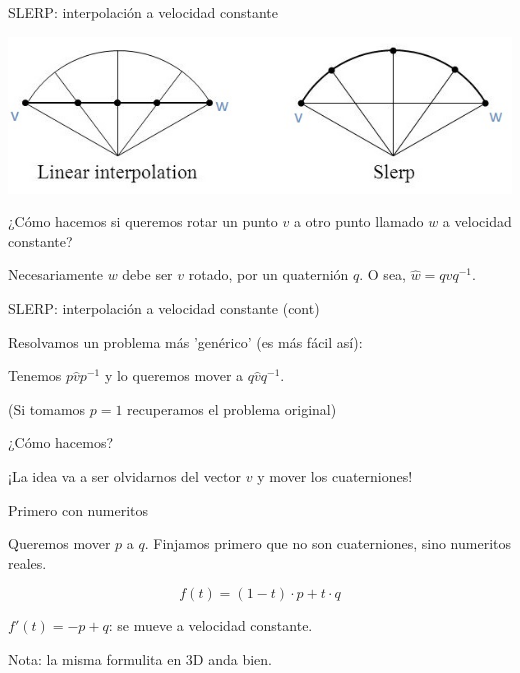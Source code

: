 \documentclass[10pt]{beamer}
\def\m{^{-1}}
\begin{document}
\fi


\begin{frame}{SLERP: interpolación a velocidad constante}

\includegraphics[scale=0.66]{Slerp2.jpg} \bigskip

¿Cómo hacemos si queremos rotar un punto $v$ a otro punto llamado $w$ a velocidad constante? 

Necesariamente $w$ debe ser $v$ rotado, por un quaternión $q$. O sea, $\hat{w}=q\hat{v}q\m$. 

\end{frame}

\begin{frame}{SLERP: interpolación a velocidad constante (cont)}

Resolvamos un problema más 'genérico' (es más fácil así):

Tenemos $p\hat{v}p\m$ y lo queremos mover a $q\hat{v}q\m$.

(Si tomamos $p=1$ recuperamos el problema original) 

¿Cómo hacemos? 

¡La idea va a ser olvidarnos del vector $v$ y mover los cuaterniones!

\end{frame}

\begin{frame}{Primero con numeritos}

Queremos mover $p$ a $q$. Finjamos primero que no son cuaterniones, sino numeritos reales. 




$$f(t) = (1-t) \cdot p + t\cdot q$$

$f'(t) = - p + q$: se mueve a velocidad constante.  \bigskip


Nota: la misma formulita en 3D anda bien.


\end{frame}
\end{document}
